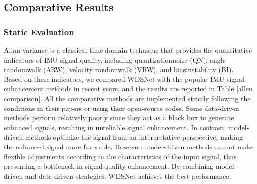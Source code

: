 \documentclass[letterpaper]{article}
\begin{document}
\subsection{Comparative Results}
\subsubsection{Static Evaluation}
Allan variance is a classical time-domain technique that provides the quantitative indicators of IMU signal quality, including quantizationnoise (QN), angle randomwalk (ARW), velocity randomwalk (VRW), and biasinstability (BI).
Based on these indicators, we compared WDSNet with the popular IMU signal enhancement methods in recent years, and the results are reported in Table \ref{allen comparison}.
All the comparative methods are implemented strictly following the conditions in their papers or using their open-source codes.
Some data-driven methods perform relatively poorly since they act as a black box to generate enhanced signals, resulting in unreliable signal enhancement. In contrast, model-driven methods optimize the signal from an interpretative perspective, making the enhanced signal more favorable. However, model-driven methods cannot make flexible adjustments according to the characteristics of the input signal, thus presenting a bottleneck in signal quality enhancement.
By combining model-driven and data-driven strategies, WDSNet achieves the best performance.
\end{document}

